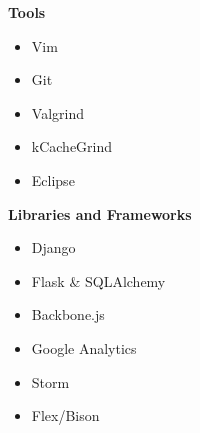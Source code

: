 \documentclass[overlapped]{res}
\begin{document}
\begin{resume}
\begin{multicols}{3}
        \textbf{Tools}
        \begin{itemize}
            \item Vim
            \item Git
            \item Valgrind
            \item kCacheGrind
            \item Eclipse
        \end{itemize}
        \columnbreak

        \textbf{Libraries and Frameworks}
        \begin{itemize}
            \item Django
            \item Flask \& SQLAlchemy
            \item Backbone.js
            \item Google Analytics
            \item Storm
            \item Flex/Bison
        \end{itemize}
    \end{multicols}


\end{resume}
\end{document}
